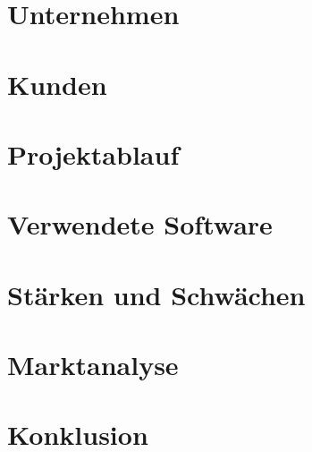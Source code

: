 \section{Unternehmen}


\section{Kunden}


\section{Projektablauf}\label{chap:projektablauf}


\section{Verwendete Software}


\section{Stärken und Schwächen}


\section{Marktanalyse}


\section{Konklusion}


% 
